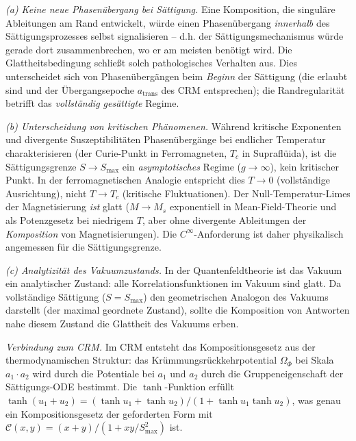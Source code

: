 \documentclass[aps,prd,twocolumn,superscriptaddress,nofootinbib]{revtex4-2}
\begin{document}
\textit{(a) Keine neue Phasenübergang bei Sättigung.} Eine Komposition, die singuläre Ableitungen am Rand entwickelt, würde einen Phasenübergang \textit{innerhalb} des Sättigungsprozesses selbst signalisieren -- d.h. der Sättigungsmechanismus würde gerade dort zusammenbrechen, wo er am meisten benötigt wird. Die Glattheitsbedingung schließt solch pathologisches Verhalten aus. Dies unterscheidet sich von Phasenübergängen beim \textit{Beginn} der Sättigung (die erlaubt sind und der Übergangsepoche $a_{\mathrm{trans}}$ des CRM entsprechen); die Randregularität betrifft das \textit{vollständig gesättigte} Regime.

\textit{(b) Unterscheidung von kritischen Phänomenen.} Während kritische Exponenten und divergente Suszeptibilitäten Phasenübergänge bei endlicher Temperatur charakterisieren (der Curie-Punkt in Ferromagneten, $T_c$ in Supraflüida), ist die Sättigungsgrenze $S \to S_{\max}$ ein \textit{asymptotisches} Regime ($g \to \infty$), kein kritischer Punkt. In der ferromagnetischen Analogie entspricht dies $T \to 0$ (vollständige Ausrichtung), nicht $T \to T_c$ (kritische Fluktuationen). Der Null-Temperatur-Limes der Magnetisierung \textit{ist} glatt ($M \to M_s$ exponentiell in Mean-Field-Theorie und als Potenzgesetz bei niedrigem $T$, aber ohne divergente Ableitungen der \textit{Komposition} von Magnetisierungen). Die $C^\infty$-Anforderung ist daher physikalisch angemessen für die Sättigungsgrenze.

\textit{(c) Analytizität des Vakuumzustands.} In der Quantenfeldtheorie ist das Vakuum ein analytischer Zustand: alle Korrelationsfunktionen im Vakuum sind glatt. Da vollständige Sättigung ($S = S_{\max}$) den geometrischen Analogon des Vakuums darstellt (der maximal geordnete Zustand), sollte die Komposition von Antworten nahe diesem Zustand die Glattheit des Vakuums erben.

\textit{Verbindung zum CRM.} Im CRM entsteht das Kompositionsgesetz aus der thermodynamischen Struktur: das Krümmungsrückkehrpotential $\Omega_\Phi$ bei Skala $a_1 \cdot a_2$ wird durch die Potentiale bei $a_1$ und $a_2$ durch die Gruppeneigenschaft der Sättigungs-ODE bestimmt. Die $\tanh$-Funktion erfüllt $\tanh(u_1 + u_2) = (\tanh u_1 + \tanh u_2)/(1 + \tanh u_1 \tanh u_2)$, was genau ein Kompositionsgesetz der geforderten Form mit $\mathcal{C}(x,y) = (x + y)/(1 + xy/S_{\max}^2)$ ist.


\end{document}
